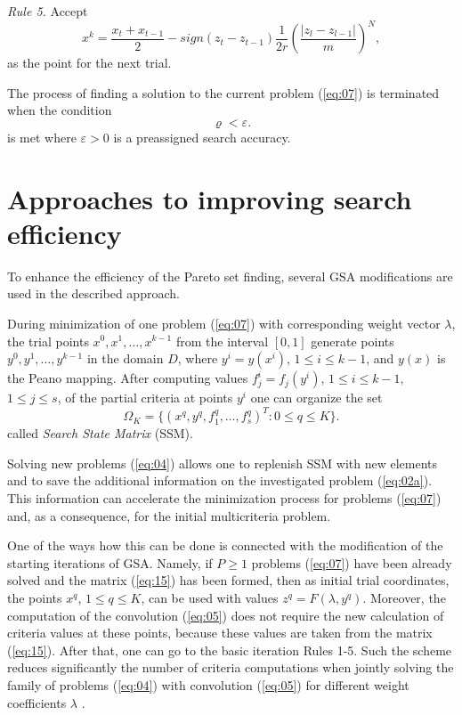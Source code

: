 \documentclass[runningheads]{llncs}
\begin{document}
\textit{Rule 5.} Accept
\begin{equation}
    \label{eq:13}
    x^{k} = \frac{x_t + x_{t-1}}{2} - sign(z_t - z_{t-1}) \frac{1}{2r} \left(\frac{|z_l - z_{l-1}|}{m} \right)^N,
\end{equation}
as the point for the next trial.

The process of finding a solution to the current problem (\ref{eq:07}) is terminated when the condition
\begin{equation}
    \label{eq:14}
    \varrho < \varepsilon.
\end{equation}
is met where $\varepsilon > 0$ is a preassigned search accuracy.


\section{Approaches to improving search efficiency}
\label{sec:4}

To enhance the efficiency of the Pareto set finding, several GSA modifications are used in the described approach.

During minimization of one problem (\ref{eq:07}) with corresponding weight vector $\lambda$, the trial points $x^0, x^1,\dots,x^{k-1}$ from the interval $[0,1]$ generate points $y^0, y^1,\dots,y^{k-1}$ in the domain $D$, where $y^i=y(x^i)$, $1 \leq i \leq k-1$, and $y(x)$ is the Peano mapping. After computing values $f^i_j=f_j(y^i)$, $1 \leq i \leq k-1$, $1 \leq j \leq s$, of the partial criteria at points $y^i$ one can organize the set 
\begin{equation}
    \label{eq:15}
    \Omega_K=\{(x^q,y^q,f^q_1,\dots,f^q_s)^T: 0 \leq q \leq K\}.
\end{equation}
called \textit{Search State Matrix} (SSM).

Solving new problems (\ref{eq:04}) allows one to replenish SSM with new elements and to save the additional information on the investigated problem (\ref{eq:02a}). This information can accelerate the minimization process for problems (\ref{eq:07}) and, as a consequence, for the initial multicriteria problem. 

One of the ways how this can be done is connected with the modification of the starting iterations of GSA. Namely, if $P \geq 1$ problems (\ref{eq:07}) have been already solved and the matrix (\ref{eq:15}) has been formed, then as initial trial coordinates, the points $x^q$, $1 \leq q \leq K$, can be used with values $z^q = F(\lambda,y^q)$. Moreover, the computation of the convolution (\ref{eq:05}) does not require the new calculation of criteria values at these points, because these values are taken from the matrix (\ref{eq:15}). After that, one can go to the basic iteration Rules 1-5. Such the scheme reduces significantly the number of criteria computations when jointly solving the family of problems (\ref{eq:04}) with convolution (\ref{eq:05}) for different weight coefficients $\lambda$ \cite{ML_MCO_2023,Gergel2018,GergelKozinov2020}.
\end{document}
